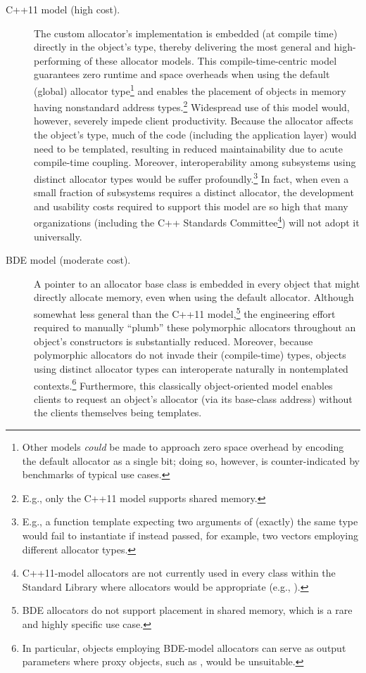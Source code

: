 \begin{description}
\item[C++11 model (high cost).] The custom allocator’s implementation is embedded
(at compile time) directly in the object’s type, thereby delivering the most general
and high-performing of these allocator models. This compile-time-centric model
guarantees zero runtime and space overheads when using the default (global)
allocator type\footnote{Other models \emph{could} be made to approach zero space overhead by encoding the default allocator as a
  single bit; doing so, however, is counter-indicated by benchmarks of typical use cases.}
and enables the placement of objects in memory having
nonstandard address types.\footnote{E.g., only the C++11 model supports shared memory.} Widespread use of this model would, however,
severely impede client productivity. Because the allocator affects the object’s
type, much of the code (including the application layer) would need to be
templated, resulting in reduced maintainability due to acute compile-time
coupling. Moreover, interoperability among subsystems using distinct allocator
types would be suffer profoundly.\footnote{E.g., a function template expecting two arguments of (exactly) the same type would fail to
instantiate if instead passed, for example, two vectors employing different allocator types.}
  In fact, when even a small fraction of
subsystems requires a distinct allocator, the development and usability costs
required to support this model are so high that many organizations (including the
C++ Standards Committee\footnote{C++11-model allocators are not currently used in every class within the Standard Library where
allocators would be appropriate (e.g., ).}) will not adopt it universally.

\item[BDE model (moderate cost).] A pointer to an allocator base class is embedded in
every object that might directly allocate memory, even when using the default
allocator. Although somewhat less general than the C++11 model,\footnote{BDE allocators do not support placement in shared memory, which is a rare and highly specific use
case.} the
engineering effort required to manually “plumb” these polymorphic allocators
throughout an object’s constructors is substantially reduced. Moreover, because
polymorphic allocators do not invade their (compile-time) types, objects using
distinct allocator types can interoperate naturally in nontemplated contexts.\footnote{In
  particular, objects employing BDE-model allocators can serve as output parameters where proxy
objects, such as , would be unsuitable.}
Furthermore, this classically object-oriented model enables clients to request an
object’s allocator (via its base-class address) without the clients themselves being
templates.


\end{description}
